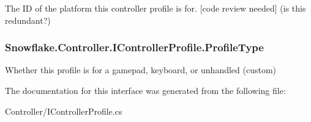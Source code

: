 The I\+D of the platform this controller profile is for. \mbox{[}code review needed\mbox{]} (is this redundant?) 

\hypertarget{interface_snowflake_1_1_controller_1_1_i_controller_profile_a4822ec076ec75e9895714a87231e3a6c}{}
\subsubsection[{Profile\+Type}]{ Snowflake.\+Controller.\+I\+Controller\+Profile.\+Profile\+Type\hspace{0.3cm}{\ttfamily [get]}}\label{interface_snowflake_1_1_controller_1_1_i_controller_profile_a4822ec076ec75e9895714a87231e3a6c}


Whether this profile is for a gamepad, keyboard, or unhandled (custom) 



The documentation for this interface was generated from the following file\+:\begin{DoxyCompactItemize}
\item 
Controller/I\+Controller\+Profile.\+cs\end{DoxyCompactItemize}
